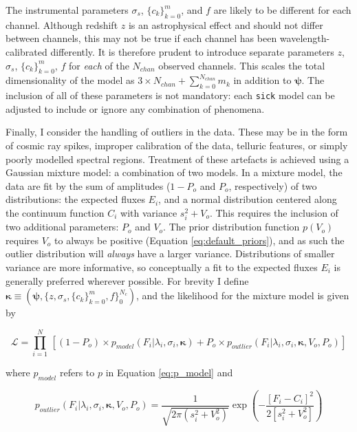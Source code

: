 \documentclass[iop]{emulateapj}
\newcommand{\sick}{\texttt{sick}}
\begin{document}
The instrumental parameters $\sigma_{s}$, $\{c_k\}_{k=0}^{m}$, and $f$ are likely 
to be different for each channel. Although redshift $z$ is an astrophysical effect 
and should not differ between channels, this may not be true if each channel has 
been wavelength-calibrated differently. It is therefore prudent to introduce 
separate parameters $z$, $\sigma_{s}$, $\{c_k\}_{k=0}^{m}$, $f$ for \textit{each} 
of the $N_{chan}$ observed channels. This scales the total dimensionality of the 
model as $3\times{}N_{chan} + \sum_{k=0}^{N_{chan}}m_{k}$ in addition to $\bm{\psi}$. 
The inclusion of all of these parameters is not mandatory: each \sick{} model can 
be adjusted to include or ignore any combination of phenomena. 

Finally, I consider the handling of outliers in the data. These may be in the form 
of cosmic ray spikes, improper calibration of the data, telluric features, or simply 
poorly modelled spectral regions. Treatment of these artefacts is achieved using a 
Gaussian mixture model: a combination of two models. In a mixture model, the data 
are fit by the sum of amplitudes ($1 - P_o$ and $P_o$, respectively) of two 
distributions: the expected fluxes $E_i$, and a normal distribution centered along 
the continuum function $C_i$ with variance $s_{i}^2 + V_{o}$. This requires the 
inclusion of two  additional parameters: $P_o$ and $V_o$. The prior 
distribution function $p\left(V_o\right)$ requires $V_{o}$ to always be positive 
(Equation \ref{eq:default_priors}), and as such the outlier distribution will 
\textit{always} have a larger variance. Distributions of smaller variance are more 
informative, so conceptually a fit to the expected fluxes $E_{i}$ is generally 
preferred wherever possible. For brevity I define $\bm{\kappa} \equiv (\bm{\psi},\{z,\sigma_s,\{c_k\}_{k=0}^{m},f\}_{0}^{N_{c}})$, and the likelihood for the mixture model is given by
 
 \begin{equation}
\mathcal{L} = \prod_{i=1}^{N}\,\left[\left(1 - P_{o}\right)\times{}p_{model}\left(F_i|\lambda_i,\sigma_{i},\bm{\kappa}\right) + P_{o}\times{}p_{outlier}\left(F_i|\lambda_i,\sigma_i,\bm{\kappa},V_{o},P_o\right)\right]
\end{equation}
 
\noindent{}where $p_{model}$ refers to $p$ in Equation \ref{eq:p_model} and 

\begin{equation}
p_{outlier}\left(F_i|\lambda_i,\sigma_i,\bm{\kappa},V_{o},P_o\right) = \frac{1}{\sqrt{2\pi\left(s_{i}^2 + V_{o}^2\right)}} \exp\left(-\frac{[F_i - C_i]^2}{2\left[s_{i}^2 + V_{o}^2\right]}\right)
\end{equation}
\end{document}
